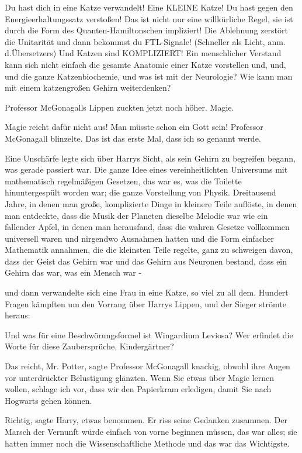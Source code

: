 \glqq Du hast dich in eine Katze verwandelt! Eine KLEINE Katze! Du hast gegen
den Energieerhaltungssatz verstoßen! Das ist nicht nur eine willkürliche Regel,
sie ist durch die Form des Quanten-Hamiltonschen impliziert! Die Ablehnung
zerstört die Unitarität und dann bekommst du FTL-Signale! (Schneller als Licht,
anm. d.Übersetzers) Und Katzen sind KOMPLIZIERT! Ein menschlicher Verstand kann
sich nicht einfach die gesamte Anatomie einer Katze vorstellen und, und, und die
ganze Katzenbiochemie, und was ist mit der Neurologie? Wie kann man mit einem
katzengroßen Gehirn weiterdenken?\grqq{}

Professor McGonagalls Lippen zuckten jetzt noch höher. \glqq Magie.\grqq{}

\glqq Magie reicht dafür nicht aus! Man müsste schon ein Gott sein!\grqq{}
Professor McGonagall blinzelte. \glqq Das ist das erste Mal, dass ich so genannt
werde.\grqq{}

Eine Unschärfe legte sich über Harrys Sicht, als sein Gehirn zu begreifen
begann, was gerade passiert war. Die ganze Idee eines vereinheitlichten
Universums mit mathematisch regelmäßigen Gesetzen, das war es, was die Toilette
hinuntergespült worden war; die ganze Vorstellung von Physik. Dreitausend Jahre,
in denen man große, komplizierte Dinge in kleinere Teile auflöste, in denen man
entdeckte, dass die Musik der Planeten dieselbe Melodie war wie ein fallender
Apfel, in denen man herausfand, dass die wahren Gesetze vollkommen universell
waren und nirgendwo Ausnahmen hatten und die Form einfacher Mathematik annahmen,
die die kleinsten Teile regelte, ganz zu schweigen davon, dass der Geist das
Gehirn war und das Gehirn aus Neuronen bestand, dass ein Gehirn das war, was ein
Mensch war -

und dann verwandelte sich eine Frau in eine Katze, so viel zu all dem. Hundert
Fragen kämpften um den Vorrang über Harrys Lippen, und der Sieger strömte
heraus:

\glqq Und was für eine Beschwörungsformel ist Wingardium Leviosa? Wer erfindet
die Worte für diese Zaubersprüche, Kindergärtner?\grqq{}

\glqq Das reicht, Mr. Potter\grqq{}, sagte Professor McGonagall knackig, obwohl
ihre Augen vor unterdrückter Belustigung glänzten. \glqq Wenn Sie etwas über
Magie lernen wollen, schlage ich vor, dass wir den Papierkram erledigen, damit
Sie nach Hogwarts gehen können.\grqq{}

\glqq Richtig\grqq{}, sagte Harry, etwas benommen. Er riss seine Gedanken
zusammen. Der Marsch der Vernunft würde einfach von vorne beginnen müssen, das
war alles; sie hatten immer noch die Wissenschaftliche Methode und das war das
Wichtigste.

